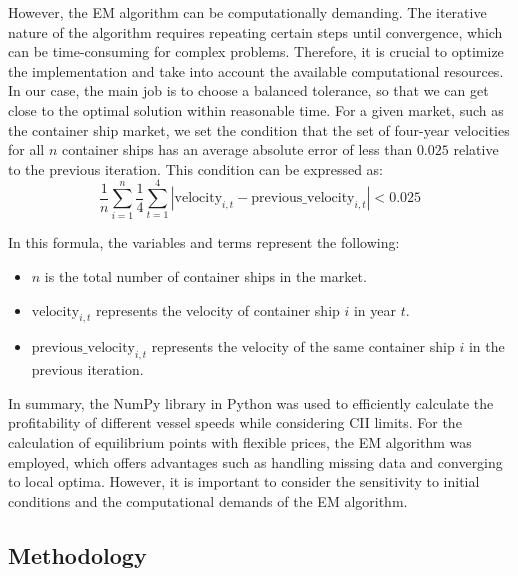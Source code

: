 \documentclass[a4paper,12pt]{article}
\begin{document}
However, the EM algorithm can be computationally demanding.
The iterative nature of the algorithm requires repeating certain steps until convergence, which can be time-consuming for complex problems.
Therefore, it is crucial to optimize the implementation and take into account the available computational resources.
In our case, the main job is to choose a balanced tolerance, so that we can get close to the optimal solution within reasonable time.
For a given market, such as the container ship market, we set the condition that the set of four-year velocities for all $n$ container ships has an average absolute error of less than $0.025$ relative to the previous iteration.
This condition can be expressed as:
\begin{equation}
	\frac{1}{n}\sum_{i=1}^{n} \frac{1}{4} \sum_{t=1}^{4} \left| \text{velocity}_{i,t} - \text{previous\_velocity}_{i,t} \right| < 0.025
\end{equation}

In this formula, the variables and terms represent the following:
\begin{itemize}
	\item $n$ is the total number of container ships in the market.
	\item $\text{velocity}_{i,t}$ represents the velocity of container ship $i$ in year $t$.
	\item $\text{previous\_velocity}_{i,t}$ represents the velocity of the same container ship $i$ in the previous iteration.
\end{itemize}

In summary, the NumPy library in Python was used to efficiently calculate the profitability of different vessel speeds while considering CII limits.
For the calculation of equilibrium points with flexible prices, the EM algorithm was employed, which offers advantages such as handling missing data and converging to local optima.
However, it is important to consider the sensitivity to initial conditions and the computational demands of the EM algorithm.\\

\subsection{Methodology}
\end{document}
